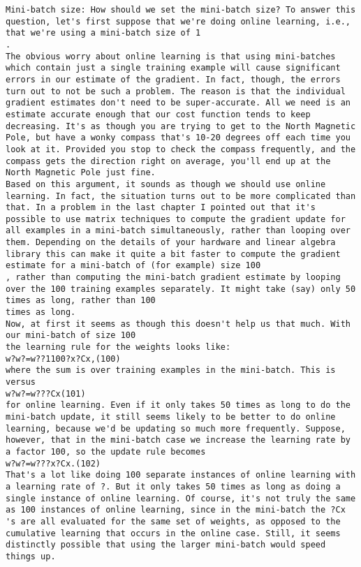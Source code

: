 \begin{lstlisting}
Mini-batch size: How should we set the mini-batch size? To answer this question, let's first suppose that we're doing online learning, i.e., that we're using a mini-batch size of 1
.
The obvious worry about online learning is that using mini-batches which contain just a single training example will cause significant errors in our estimate of the gradient. In fact, though, the errors turn out to not be such a problem. The reason is that the individual gradient estimates don't need to be super-accurate. All we need is an estimate accurate enough that our cost function tends to keep decreasing. It's as though you are trying to get to the North Magnetic Pole, but have a wonky compass that's 10-20 degrees off each time you look at it. Provided you stop to check the compass frequently, and the compass gets the direction right on average, you'll end up at the North Magnetic Pole just fine.
Based on this argument, it sounds as though we should use online learning. In fact, the situation turns out to be more complicated than that. In a problem in the last chapter I pointed out that it's possible to use matrix techniques to compute the gradient update for all examples in a mini-batch simultaneously, rather than looping over them. Depending on the details of your hardware and linear algebra library this can make it quite a bit faster to compute the gradient estimate for a mini-batch of (for example) size 100
, rather than computing the mini-batch gradient estimate by looping over the 100 training examples separately. It might take (say) only 50 times as long, rather than 100
times as long.
Now, at first it seems as though this doesn't help us that much. With our mini-batch of size 100
the learning rule for the weights looks like: 
w?w?=w??1100?x?Cx,(100)
where the sum is over training examples in the mini-batch. This is versus 
w?w?=w???Cx(101)
for online learning. Even if it only takes 50 times as long to do the mini-batch update, it still seems likely to be better to do online learning, because we'd be updating so much more frequently. Suppose, however, that in the mini-batch case we increase the learning rate by a factor 100, so the update rule becomes 
w?w?=w???x?Cx.(102)
That's a lot like doing 100 separate instances of online learning with a learning rate of ?. But it only takes 50 times as long as doing a single instance of online learning. Of course, it's not truly the same as 100 instances of online learning, since in the mini-batch the ?Cx
's are all evaluated for the same set of weights, as opposed to the cumulative learning that occurs in the online case. Still, it seems distinctly possible that using the larger mini-batch would speed things up.

\end{lstlisting}
